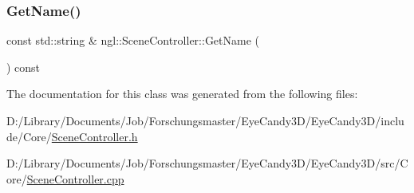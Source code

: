 \subsubsection{\texorpdfstring{Get\+Name()}{GetName()}}
{\footnotesize\ttfamily const std\+::string \& ngl\+::\+Scene\+Controller\+::\+Get\+Name (\begin{DoxyParamCaption}{ }\end{DoxyParamCaption}) const}



The documentation for this class was generated from the following files\+:\begin{DoxyCompactItemize}
\item 
D\+:/\+Library/\+Documents/\+Job/\+Forschungsmaster/\+Eye\+Candy3\+D/\+Eye\+Candy3\+D/include/\+Core/\mbox{\hyperlink{_scene_controller_8h}{Scene\+Controller.\+h}}\item 
D\+:/\+Library/\+Documents/\+Job/\+Forschungsmaster/\+Eye\+Candy3\+D/\+Eye\+Candy3\+D/src/\+Core/\mbox{\hyperlink{_scene_controller_8cpp}{Scene\+Controller.\+cpp}}\end{DoxyCompactItemize}
